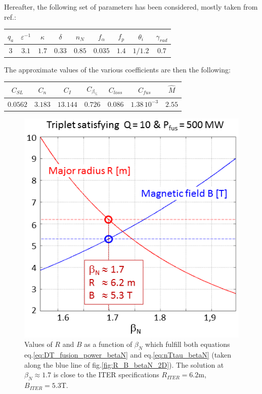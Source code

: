 Hereafter, the following set of parameters has been considered, mostly taken from ref.\cite{Johner2011}:
\begin{center}
	\begin{tabular}{c|c|c|c|c|c|c|c|c}
		\hline
		$q_a$ & $\varepsilon^{-1}$ & $\kappa$ & $\delta$ & $n_N$ & $f_\alpha$ & $f_p$ & $\theta_i$ & $\gamma_{rad}$ \\
		\hline
		$3$   & $3.1$ & $1.7$ & $0.33$ & $0.85$ & $0.035$ & $1.4$ & $1/1.2$ & $0.7$ \\
		\hline	
	\end{tabular}
\end{center}
The approximate values of the various coefficients are then the following:
\begin{center}
	\begin{tabular}{c|c|c|c|c|c|c}
		\hline
		$C_{SL}$ & $C_n$ & $C_I$ & $C_{\beta_\%}$ & $C_{loss}$ & $C_{fus}$ & $\hat M$ \\
		\hline
		$0.0562$ & $3.183$ & $13.144$ & $0.726$ & $0.086$ & $1.38\,10^{-3}$ & $2.55$ \\
		\hline	
	\end{tabular}
\end{center}
\bigskip

\begin{figure} 
	\centering
	\includegraphics[width=.8\textwidth]{figures/Fig_R_B_betaN_solutions_v3.png}
	\caption{Values of $R$ and $B$ as a function of $\beta_N$ which fulfill both equations eq.\ref{eq:DT_fusion_power_betaN} and eq.\ref{eq:nTtau_betaN} (taken along the blue line of fig.\ref{fig:R_B_betaN_2D}). The solution at $\beta_N \approx 1.7$ is close to the ITER specifications $R_{ITER}=6.2$m, $B_{ITER}=5.3$T.}
	\label{fig:solutions_betaN}
\end{figure}



